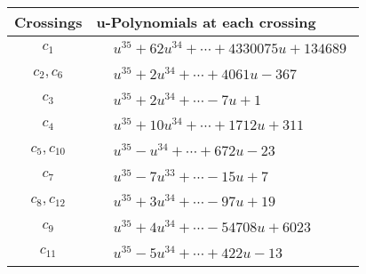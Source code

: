 \documentclass[1p]{elsarticle_modified}
\theoremstyle{definition}
\begin{document}
\begin{tabular}{m{50pt}|m{274pt}}
Crossings & \hspace{64pt}u-Polynomials at each crossing \\
\hline $$\begin{aligned}c_{1}\end{aligned}$$&$\begin{aligned}
&u^{35}+62 u^{34}+\cdots+4330075 u+134689
\end{aligned}$\\
\hline $$\begin{aligned}c_{2},c_{6}\end{aligned}$$&$\begin{aligned}
&u^{35}+2 u^{34}+\cdots+4061 u-367
\end{aligned}$\\
\hline $$\begin{aligned}c_{3}\end{aligned}$$&$\begin{aligned}
&u^{35}+2 u^{34}+\cdots-7 u+1
\end{aligned}$\\
\hline $$\begin{aligned}c_{4}\end{aligned}$$&$\begin{aligned}
&u^{35}+10 u^{34}+\cdots+1712 u+311
\end{aligned}$\\
\hline $$\begin{aligned}c_{5},c_{10}\end{aligned}$$&$\begin{aligned}
&u^{35}- u^{34}+\cdots+672 u-23
\end{aligned}$\\
\hline $$\begin{aligned}c_{7}\end{aligned}$$&$\begin{aligned}
&u^{35}-7 u^{33}+\cdots-15 u+7
\end{aligned}$\\
\hline $$\begin{aligned}c_{8},c_{12}\end{aligned}$$&$\begin{aligned}
&u^{35}+3 u^{34}+\cdots-97 u+19
\end{aligned}$\\
\hline $$\begin{aligned}c_{9}\end{aligned}$$&$\begin{aligned}
&u^{35}+4 u^{34}+\cdots-54708 u+6023
\end{aligned}$\\
\hline $$\begin{aligned}c_{11}\end{aligned}$$&$\begin{aligned}
&u^{35}-5 u^{34}+\cdots+422 u-13
\end{aligned}$\\
\hline
\end{tabular}\\~\\
\end{document}

